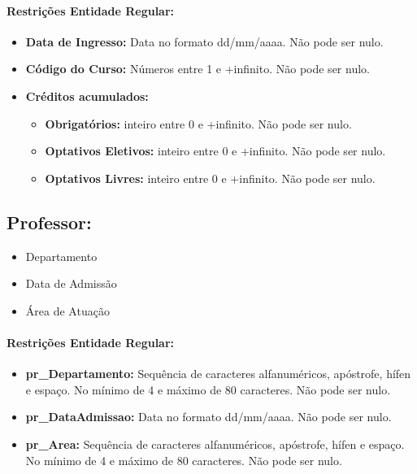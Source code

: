 \documentclass{report}
\begin{document}
\paragraph{Restrições Entidade Regular:}
\begin{itemize}
  \item \textbf{Data de Ingresso:} Data no formato dd/mm/aaaa. Não pode ser nulo.
  \item \textbf{Código do Curso:} Números entre 1 e +infinito. Não pode ser nulo.
  \item \textbf{Créditos acumulados:}
  \begin{itemize}
  	\item \textbf{Obrigatórios:} inteiro entre 0 e +infinito. Não pode ser nulo.
  	\item \textbf{Optativos Eletivos:} inteiro entre 0 e +infinito. Não pode ser nulo.
  	\item \textbf{Optativos Livres:} inteiro entre 0 e +infinito. Não pode ser nulo.
  \end{itemize}
\end{itemize}

\subsection{Professor:}
\begin{itemize}
  \item Departamento
  \item Data de Admissão
  \item Área de Atuação
\end{itemize}
\paragraph{Restrições Entidade Regular:}
\begin{itemize}
  \item \textbf{pr\_Departamento:} Sequência de caracteres alfanuméricos, apóstrofe, hífen e espaço. No mínimo de 4 e máximo de 80 caracteres. Não pode ser nulo.
  \item \textbf{pr\_DataAdmissao:} Data no formato dd/mm/aaaa. Não pode ser nulo.
  \item \textbf{pr\_Area:} Sequência de caracteres alfanuméricos, apóstrofe, hífen e espaço. No mínimo de 4 e máximo de 80 caracteres. Não pode ser nulo.
\end{itemize}
\end{document}
